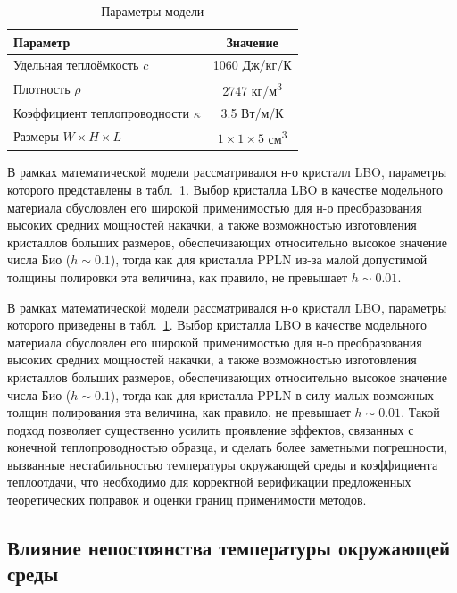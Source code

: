
\begin{table}[h]
	\centering
	\caption{Параметры модели}
	\begin{tabular}{|l|c|}
		\hline
		\textbf{Параметр} & \textbf{Значение} \\
		\hline
		Удельная теплоёмкость $c$ \cite{nikogosyan2005nonlinear} & 1060 Дж/кг/К \\
		Плотность $\rho$ \cite{nikogosyan2005nonlinear} & 2747 кг/м\textsuperscript{3} \\
		Коэффициент теплопроводности $\kappa$ \cite{nikogosyan2005nonlinear} & 3.5 Вт/м/К \\
		Размеры $W \times H \times L$ & $1 \times 1 \times 5$ см\textsuperscript{3} \\
		\hline
	\end{tabular}
	\label{table:gradient_experiment}
\end{table}

В рамках математической модели рассматривался н-о кристалл LBO, параметры которого представлены в табл.~\ref{table:gradient_experiment}. Выбор кристалла LBO в качестве модельного материала обусловлен его широкой применимостью для н-о преобразования высоких средних мощностей накачки, а также возможностью изготовления кристаллов больших размеров, обеспечивающих относительно высокое значение числа Био ($h\sim 0.1$), тогда как для кристалла PPLN из-за малой допустимой толщины полировки эта величина, как правило, не превышает $h\sim 0.01$.

В рамках математической модели рассматривался н-о кристалл LBO, параметры которого приведены в табл.~\cref{table:gradient_experiment}. Выбор кристалла LBO в качестве модельного материала обусловлен его широкой применимостью для н-о преобразования высоких средних мощностей накачки, а также возможностью изготовления кристаллов больших размеров, обеспечивающих относительно высокое значение числа Био ($h\sim 0.1$), тогда как для кристалла PPLN в силу малых возможных толщин полирования эта величина, как правило, не превышает $h\sim 0.01$. Такой подход позволяет существенно усилить проявление эффектов, связанных с конечной теплопроводностью образца, и сделать более заметными погрешности, вызванные нестабильностью температуры окружающей среды и коэффициента теплоотдачи, что необходимо для корректной верификации предложенных теоретических поправок и оценки границ применимости методов.

\subsection{Влияние непостоянства температуры окружающей среды}

